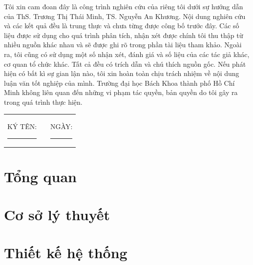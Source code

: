 \documentclass[a4paper, oneside, 13pt]{report}
\theoremstyle{definition}
\begin{document}
	Tôi xin cam đoan đây là công trình nghiên cứu của riêng tôi dưới sự hướng dẫn của ThS. Trương Thị Thái Minh, TS. Nguyễn An Khương. Nội dung nghiên cứu và các kết quả đều là trung thực và chưa từng được công bố trước đây. Các số liệu được sử dụng cho quá trình phân tích, nhận xét được chính tôi thu thập từ nhiều nguồn khác nhau và sẽ được ghi rõ trong phần tài liệu tham khảo. Ngoài ra, tôi cũng có sử dụng một số nhận xét, đánh giá và số liệu của các tác giả khác, cơ quan tổ chức khác. Tất cả đều có trích dẫn và chú thích nguồn gốc. Nếu phát hiện có bất kì sự gian lận nào, tôi xin hoàn toàn chịu trách nhiệm về nội dung luận văn tốt nghiệp của mình. Trường đại học Bách Khoa thành phố Hồ Chí Minh không liên quan đến những vi phạm tác quyền, bản quyền do tôi gây ra trong quá trình thực hiện.
	
	\vspace{1cm}
	
	\begin{center}
		\begin{tabular}{c c c}
			KÝ TÊN: \rule{4cm}{0.15mm} &\hspace{4cm}& NGÀY: \rule{4cm}{0.15mm}
		\end{tabular}
	\end{center}
\setlength{\parskip}{0mm}

\newpage


\tableofcontents


\chapter{Tổng quan}



\chapter{Cơ sở lý thuyết}
% 


\chapter{Thiết kế hệ thống}
% 

\newpage
% 

\newpage
% 
\end{document}
